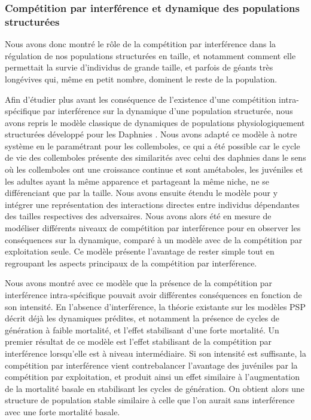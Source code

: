 \subsubsection{Compétition par interférence et dynamique des populations
structurées}

Nous avons donc montré le rôle de la compétition par interférence dans la
régulation de nos populations structurées en taille, et notamment comment elle
permettait la survie d'individus de grande taille, et parfois de géants très
longévives qui, même en petit nombre, dominent le reste de la population. 

Afin d'étudier plus avant les conséquence de l'existence d'une compétition
intra-spécifique par interférence sur la dynamique d'une population structurée,
nous avons repris le modèle classique de dynamiques de populations
physiologiquement structurées développé pour les Daphnies
\autocites{kooijman1984a}. Nous avons adapté ce modèle à notre système en le
paramétrant pour les collemboles, ce qui a été possible car le cycle de vie des
collemboles présente des similarités avec celui des daphnies dans le sens où les
collemboles ont une croissance continue et sont amétaboles, les juvéniles et les
adultes ayant la même apparence et partageant la même niche, ne se différenciant
que par la taille. Nous avons ensuite étendu le modèle pour y intégrer une
représentation des interactions directes entre individus dépendantes des
tailles respectives des adversaires. Nous avons alors été en mesure de modéliser
différents niveaux de compétition par interférence pour en observer les
conséquences sur la dynamique, comparé à un modèle avec de la
compétition par exploitation seule. Ce modèle présente l'avantage de rester
simple tout en regroupant les aspects principaux de la compétition par
interférence.

Nous avons montré avec ce modèle que la présence de la compétition par
interférence intra-spécifique pouvait avoir différentes conséquences en fonction
de son intensité. En l'absence d'interférence, la théorie existante sur les
modèles PSP décrit déjà les dynamiques prédites, et notamment la présence de
cycles de génération à faible mortalité, et l'effet stabilisant d'une forte
mortalité. Un premier résultat de ce modèle est l'effet stabilisant de la
compétition par interférence lorsqu'elle est à niveau intermédiaire. Si son
intensité est suffisante, la compétition par interférence vient contrebalancer
l'avantage des juvéniles par la compétition par exploitation, et produit ainsi
un effet similaire à l'augmentation de la mortalité basale en stabilisant les
cycles de génération. On obtient alors une structure de population stable
similaire à celle que l'on aurait sans interférence avec une forte mortalité
basale. 

